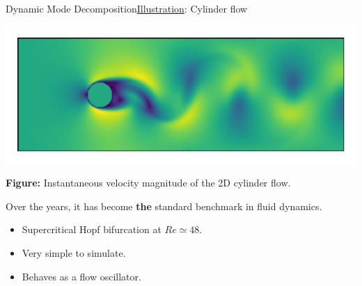 \documentclass[usenames,dvipsnames,svgnames,10pt,aspectratio=169]{beamer}
\begin{document}
\begin{frame}[t, c]{Dynamic Mode Decomposition}{\underline{Illustration}: Cylinder flow}
	\begin{minipage}{.48\textwidth}
		\begin{center}
			\includegraphics[width=.9\textwidth]{cylinder_flow}
		\end{center}

		\textbf{Figure:} Instantaneous velocity magnitude of the 2D cylinder flow.
	\end{minipage}%
	\hfill
	\begin{minipage}{.48\textwidth}
		Over the years, it has become \textbf{the} standard benchmark in fluid dynamics.
		\begin{itemize}
			\item Supercritical Hopf bifurcation at $Re \simeq 48$.
			\item Very simple to simulate.
			\item Behaves as a flow oscillator.
		\end{itemize}
	\end{minipage}

	\vspace{1cm}
\end{frame}
\end{document}
